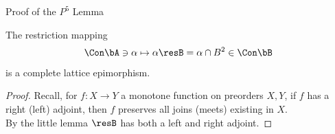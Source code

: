 \begin{frame}[fragile,label=P5Lemma]{Proof of the $P^5$ Lemma}
  \begin{lemma}
The restriction mapping 
\[
\Con\bA \ni \alpha \mapsto \alpha\resB = \alpha \cap B^2 \in \Con \bB
\]
is a complete lattice epimorphism. %
  \end{lemma}
\begin{proof}
  Recall, for $f: X \to Y$ a monotone function on preorders $X, Y$,
  if $f$ has a right (left) adjoint, then $f$ preserves all joins (meets)
  existing in $X$.\\[5pt]
  By the little lemma $\resB$ has both a left and right adjoint.
\end{proof}
\end{frame}

























































